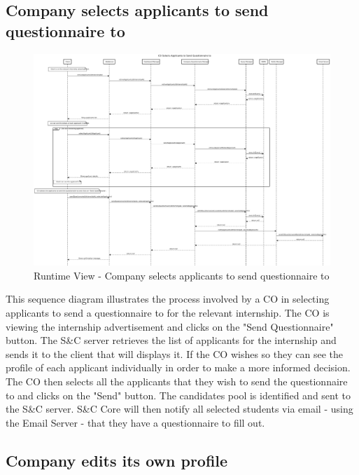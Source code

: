 \subsection{Company selects applicants to send questionnaire to}
\label{sub:company-selects-applicants-to-send-questionnaire-to}%

\begin{figure}[H]
      \centering
      \includegraphics[width=1.0\textwidth]{Images/RV_08.pdf}
      \caption{Runtime View - Company selects applicants to send questionnaire to}
      \label{fig:rv-co-selects-applicants}
\end{figure}

\par This sequence diagram illustrates the process involved by a CO in selecting applicants to send a questionnaire to
for the relevant internship. The CO is viewing the internship advertisement and clicks on the "Send Questionnaire"
button. The S\&C server retrieves the list of applicants for the internship and sends it to the client that will
displays it. If the CO wishes so they can see the profile of each applicant individually in order to make a more
informed decision. The CO then selects all the applicants that they wish to send the questionnaire to and clicks on
the "Send" button. The candidates pool is identified and sent to the S\&C server. S\&C Core will then notify all
selected students via email - using the Email Server - that they have a questionnaire to fill out.

\subsection{Company edits its own profile}
\label{sub:company-edits-its-own-profile}%

